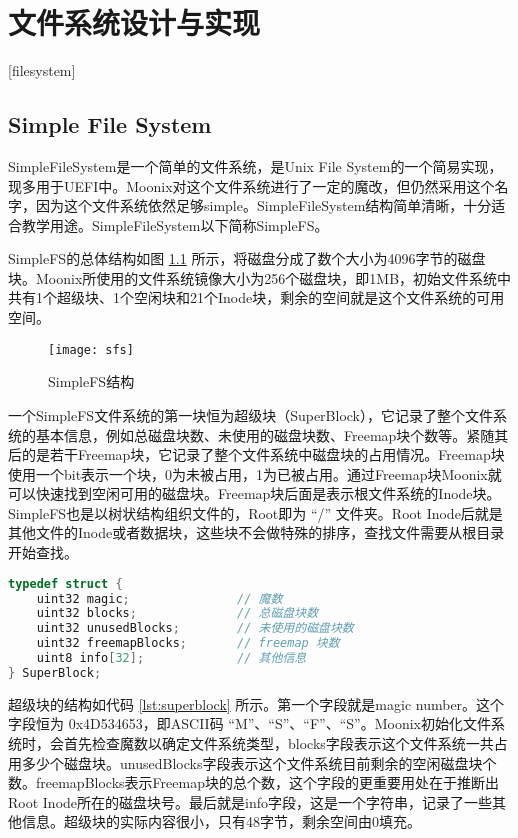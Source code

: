 
\chapter{文件系统设计与实现}[filesystem]
\label{chapter:filesystem}

\section{Simple File System}

SimpleFileSystem是一个简单的文件系统，是Unix File System\cite{ufs}的一个简易实现，现多用于UEFI中。Moonix对这个文件系统进行了一定的魔改，但仍然采用这个名字，因为这个文件系统依然足够simple。SimpleFileSystem结构简单清晰，十分适合教学用途。SimpleFileSystem以下简称SimpleFS。

SimpleFS的总体结构如图 \ref{pic:sfs} 所示，将磁盘分成了数个大小为4096字节的磁盘块。Moonix所使用的文件系统镜像大小为256个磁盘块，即1MB，初始文件系统中共有1个超级块、1个空闲块和21个Inode块，剩余的空间就是这个文件系统的可用空间。

\begin{figure}[htpb]
	\centering
	\texttt{[image: sfs]}
	\setlength{\abovecaptionskip}{2pt}
	\caption{SimpleFS结构}
	\label{pic:sfs}
\end{figure}

一个SimpleFS文件系统的第一块恒为超级块（SuperBlock），它记录了整个文件系统的基本信息，例如总磁盘块数、未使用的磁盘块数、Freemap块个数等。紧随其后的是若干Freemap块，它记录了整个文件系统中磁盘块的占用情况。Freemap块使用一个bit表示一个块，0为未被占用，1为已被占用。通过Freemap块Moonix就可以快速找到空闲可用的磁盘块。Freemap块后面是表示根文件系统的Inode块。SimpleFS也是以树状结构组织文件的，Root即为 “/” 文件夹。Root Inode后就是其他文件的Inode或者数据块，这些块不会做特殊的排序，查找文件需要从根目录开始查找。

\begin{lstlisting}[language={C}, caption={SimpleFS超级块结构}, label={lst:superblock}]
typedef struct {
	uint32 magic;               // 魔数
	uint32 blocks;              // 总磁盘块数
	uint32 unusedBlocks;        // 未使用的磁盘块数
	uint32 freemapBlocks;       // freemap 块数
	uint8 info[32];             // 其他信息
} SuperBlock;
\end{lstlisting}

超级块的结构如代码 \ref{lst:superblock} 所示。第一个字段就是magic number。这个字段恒为 0x4D534653，即ASCII码 “M”、“S”、“F”、“S”。Moonix初始化文件系统时，会首先检查魔数以确定文件系统类型，blocks字段表示这个文件系统一共占用多少个磁盘块。unusedBlocks字段表示这个文件系统目前剩余的空闲磁盘块个数。freemapBlocks表示Freemap块的总个数，这个字段的更重要用处在于推断出Root Inode所在的磁盘块号。最后就是info字段，这是一个字符串，记录了一些其他信息。超级块的实际内容很小，只有48字节，剩余空间由0填充。

